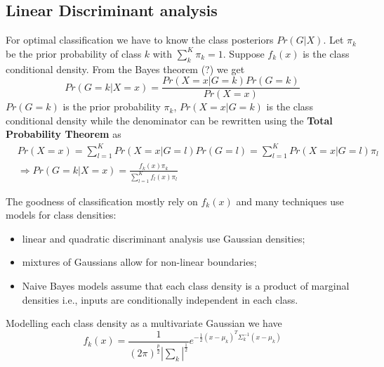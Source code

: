 \documentclass[12pt, letterpaper]{article}
\theoremstyle{definition}
\begin{document}
\subsection{Linear Discriminant analysis}
\label{LDA}
For optimal classification we have to know the class posteriors $Pr\left( G|X\right)$. Let $\pi_k$ be the prior probability of class $k$ with $\sum_k^K \pi_k=1$. Suppose $f_k(x)$ is the class conditional density.
From the Bayes theorem (?) we get 
\begin{equation}
Pr\left( G=k | X=x\right) = \frac{Pr\left( X=x |G=k \right)Pr(G=k)}{Pr(X=x)}
\end{equation}
% 
$Pr(G=k)$ is the prior probability $\pi_k$, $Pr\left( X=x |G=k \right)$ is the class conditional density while the denominator can be rewritten using the \textbf{Total Probability Theorem} as
\begin{align}
&Pr(X=x) = \sum_{l=1}^{K} Pr(X=x|G=l) Pr(G=l) = \sum_{l=1}^{K} Pr(X=x|G=l) \pi_l\\
&\Rightarrow Pr\left( G=k | X=x\right) =\frac{f_k(x)\pi_k}{\sum_{l=1}^Kf_l(x)\pi_l}
\end{align}

The goodness of classification mostly rely on $f_k(x)$ and many techniques use models for class densities:
\begin{itemize}
\item linear and quadratic discriminant analysis use Gaussian densities;
\item mixtures of Gaussians allow for non-linear boundaries;
\item Naive Bayes models assume that each class density is a product of marginal densities i.e., inputs are conditionally independent in each class.
\end{itemize}
Modelling each class density as a multivariate Gaussian we have
\begin{equation}
f_k(x) = \frac{1}{(2\pi)^{\frac{p}{2}}|\sum_k|^{\frac{1}{2	}}} e^{-\frac{1}{2}\left( x-\mu_k\right)^T\Sigma_k^{-1}\left( x-\mu_k\right)}
\end{equation}
\end{document}
